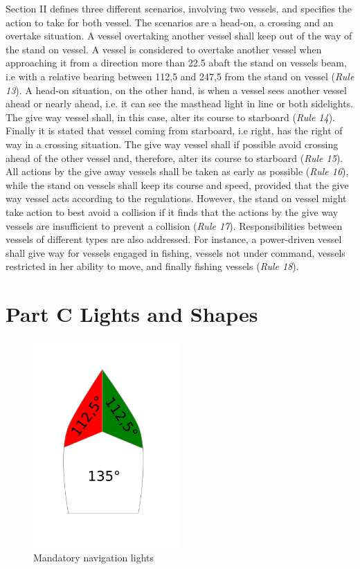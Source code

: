 Section II defines three different scenarios, involving two vessels, and specifies the action to take for both vessel. The scenarios are a head-on, a crossing and an overtake situation. A vessel overtaking another vessel shall keep out of the way of the stand on vessel. A vessel is considered to overtake another vessel when approaching it from a direction more than 22.5 \textdegree abaft the stand on vessels beam, i.e with a relative bearing between 112,5 \textdegree and 247,5 \textdegree from the stand on vessel (\textit{Rule 13}). A head-on situation, on the other hand, is when a vessel sees another vessel ahead or nearly ahead, i.e. it can see the masthead light in line or both sidelights. The give way vessel shall, in this case, alter its course to starboard (\textit{Rule 14}). Finally it is stated that vessel coming from starboard, i.e right, has the right of way in a crossing situation. The give way vessel shall if possible avoid crossing ahead of the other vessel and, therefore, alter its course to starboard  (\textit{Rule 15}). All actions by the give away vessels shall be taken as early as possible  (\textit{Rule 16}), while the stand on vessels shall keep its course and speed, provided that the give way vessel acts according to the regulations. However, the stand on vessel might take action to best avoid a collision if it finds that the actions by the give way vessels are insufficient to prevent a collision  (\textit{Rule 17}). Responsibilities between vessels of different types are also addressed. For instance, a power-driven vessel shall give way for vessels engaged in fishing,  vessels not under command,  vessels restricted in her ability to move, and finally fishing vessels   (\textit{Rule 18}).

\section{Part C Lights and Shapes}
\begin{figure}[H]
    \centering
    \includegraphics[width=0.5\textwidth]{Figures/lights}
    \caption{Mandatory navigation lights}
    \label{fig:nav_lights}
\end{figure}

